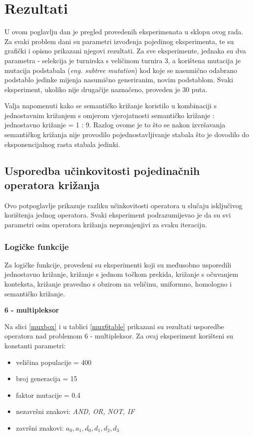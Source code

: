 \section{Rezultati}

U ovom poglavlju dan je pregled provedenih eksperimenata u sklopu ovog rada. Za svaki problem dani su parametri izvođenja pojedinog eksperimenta, te su grafički i opisno prikazani njegovi rezultati. Za sve eksperimente, jednaka su dva parametra - selekcija je turnirska s veličinom turnira 3, a korištena mutacija je mutacija podstabala (\textit{eng. subtree mutation}) kod koje se nasumično odabrano podstablo jedinke mijenja nasumično generiranim, novim podstablom. Svaki eksperiment, ukoliko nije drugačije naznačeno, proveden je 30 puta.

Valja napomenuti kako se semantičko križanje koristilo u kombinaciji s jednostavnim križanjem s omjerom vjerojatnosti semantičko križanje : jednostavno križanje = 1 : 9. Razlog ovome je to što se nakon izvršavanja semantičkog križanja nije provodilo pojednostavljivanje stabala što je dovodilo do eksponencijalnog rasta stabala jedinki.

\subsection{Usporedba učinkovitosti pojedinačnih operatora križanja}

Ovo potpoglavlje prikazuje razliku učinkovitosti operatora u slučaju isključivog korištenja jednog operatora. Svaki eksperiment podrazumijevao je da su svi parametri osim operatora križanja nepromjenjivi za svaku iteraciju.

\subsubsection{Logičke funkcije}

Za logičke funkcije, provedeni su eksperimenti koji su međusobno usporedili jednostavno križanje, križanje s jednom točkom prekida, križanje s očuvanjem konteksta, križanje pravedno s obzirom na veličinu, uniformno, homologno i semantičko križanje.

\textbf{6 - multipleksor}

Na slici \ref{muxbox} i u tablici \ref{mux6table} prikazani su rezultati usporedbe operatora nad problemom 6 - multipleksor. Za ovaj eksperiment korišteni su konstanti parametri:
\begin{itemize}
\item{veličina populacije = 400}
\item{broj generacija = 15}
\item{faktor mutacije = 0.4}
\item{nezavršni znakovi: \textit{AND, OR, NOT, IF}}
\item{završni znakovi: \textit{$a_0, a_1, d_0, d_1, d_2, d_3$}}
\end{itemize}



